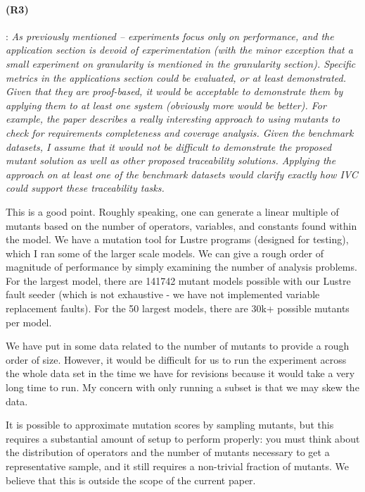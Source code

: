 \documentclass{article}
\begin{document}
\paragraph{(R3)}: \textit{As previously mentioned -- experiments focus only on performance, and the application section is devoid of experimentation (with the minor exception that a small experiment on granularity is mentioned in the granularity section). Specific metrics in the applications section could be evaluated, or at least demonstrated. Given that they are proof-based, it would be acceptable to demonstrate them by applying them to at least one system (obviously more would be better). For example, the paper describes a really interesting approach to using mutants to check for requirements completeness and coverage analysis. Given the benchmark datasets, I assume that it would not be difficult to demonstrate the proposed mutant solution as well as other proposed traceability solutions. Applying the approach on at least one of the benchmark datasets would clarify exactly how IVC could support these traceability tasks.}
\vspace{0.05in}

This is a good point.  Roughly speaking, one can generate a linear multiple of mutants based on the number of operators, variables, and constants found within the model.  We have a mutation tool for Lustre programs (designed for testing), which I ran some of the larger scale models.  We can give a rough order of magnitude of performance by simply examining the number of analysis problems.  For the largest model, there are 141742 mutant models possible with our Lustre fault seeder (which is not exhaustive - we have not implemented variable replacement faults).   For the 50 largest models, there are 30k+ possible mutants per model.

We have put in some data related to the number of mutants to provide a rough order of size.  However, it would be difficult for us to run the experiment across the whole data set in the time we have for revisions because it would take a very long time to run.  My concern with only running a subset is that we may skew the data.

It is possible to approximate mutation scores by sampling mutants, but this requires a substantial amount of setup to perform properly: you must think about the distribution of operators and the number of mutants necessary to get a representative sample, and it still requires a non-trivial fraction of mutants.  We believe that this is outside the scope of the current paper.
\end{document}
